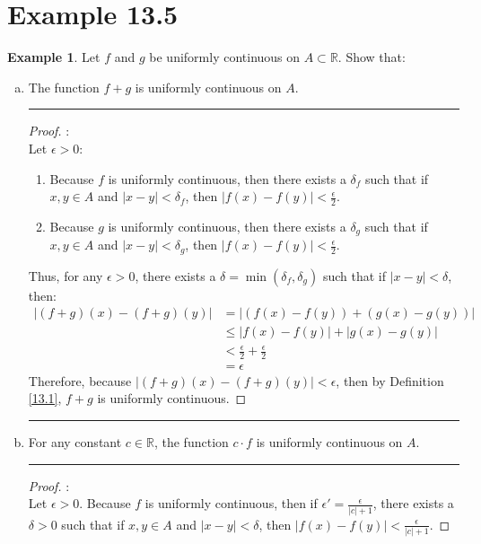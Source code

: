 \documentclass[openany, amssymb, psamsfonts]{amsart}
\newcommand{\bbR}{\mathbb{R}}
\theoremstyle{definition}
\newtheorem{exmp}{Example}[section]
\numberwithin{equation}{section}
\begin{document}
\section*{Example 13.5}
\begin{exmp}
\label{13.5}
	Let $f$ and $g$ be uniformly continuous on $A \subset \bbR$. Show that:
	\begin{enumerate}[(a)]
		\item The function $f + g$ is uniformly continuous on $A$.
\vspace{4pt}     \hrule   \vspace{4pt} \begin{proof}:\\
Let $\epsilon >0$:
\begin{enumerate}
    \item Because $f$ is uniformly continuous, then there exists a $\delta_f$ such that if $x,y\in A$ and $|x-y|<\delta_f$, then $|f(x) - f(y)|<\frac{\epsilon}{2}$. 
    \item Because $g$ is uniformly continuous, then there exists a $\delta_g$ such that if $x,y\in A$ and $|x-y|<\delta_g$, then $|f(x) - f(y)|<\frac{\epsilon}{2}$. 
\end{enumerate}
Thus, for any $\epsilon>0$, there exists a $\delta = \min(\delta_f, \delta_g)$ such that if $|x-y|<\delta$, then:
\begin{align*}
    |(f+g)(x) - (f+g)(y)|  &=  |(f(x) - f(y)) + (g(x) - g(y))|\\
\tag{Lemma 8.9}             &\leq |f(x) - f(y)| + |g(x) - g(y)|\\
\tag{By a,b}                &< \frac{\epsilon}{2}+\frac{\epsilon}{2}\\
                            &= \epsilon
\end{align*}
Therefore, because $|(f+g)(x) - (f+g)(y)| < \epsilon$, then by Definition \ref{13.1}, $f+g$ is uniformly continuous.
\end{proof} \vspace{4pt}     \hrule   \vspace{4pt}
		\item For any constant $c \in \bbR$, the function $c\cdot f$ is uniformly continuous on $A$.
  \vspace{4pt}     \hrule   \vspace{4pt} \begin{proof}:\\
Let $\epsilon >0$. Because $f$ is uniformly continuous, then if $\epsilon' = \frac{\epsilon}{|c|+1} $, there exists a $\delta>0$  such that if $x,y\in A$ and $|x-y|<\delta$, then $|f(x) - f(y)|<\frac{\epsilon}{|c|+1}$.

\end{proof}
\end{enumerate}
\end{exmp}
\end{document}
